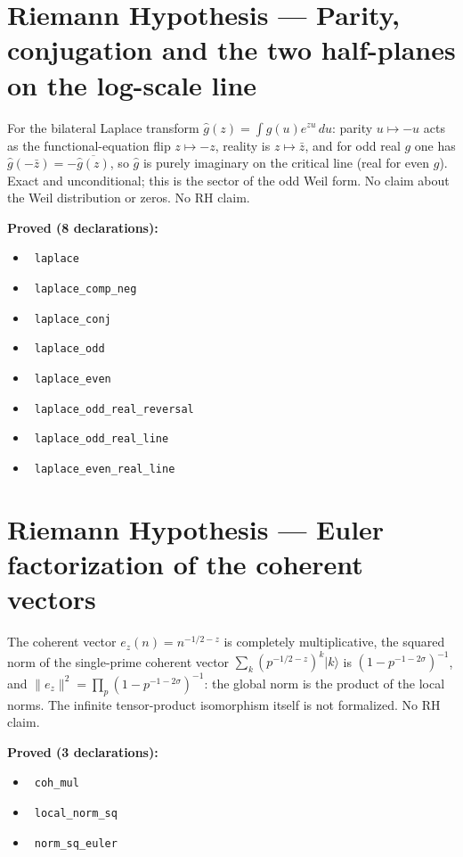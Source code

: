 \documentclass{report}
\theoremstyle{definition}
\begin{document}
\section{Riemann Hypothesis --- Parity, conjugation and the two half-planes on the log-scale line}
For the bilateral Laplace transform $\hat g(z)=\int g(u)e^{zu}\,du$: parity $u\mapsto-u$ acts as the functional-equation flip $z\mapsto-z$, reality is $z\mapsto\bar z$, and for odd real $g$ one has $\hat g(-\bar z)=-\overline{\hat g(z)}$, so $\hat g$ is purely imaginary on the critical line (real for even $g$). Exact and unconditional; this is the sector of the odd Weil form. No claim about the Weil distribution or zeros. No RH claim.

\noindent\textbf{Proved (8 declarations):}
\begin{itemize}
  \item {}\leanok\ \texttt{laplace}
  \item {}\leanok\ \texttt{laplace\_comp\_neg}
  \item {}\leanok\ \texttt{laplace\_conj}
  \item {}\leanok\ \texttt{laplace\_odd}
  \item {}\leanok\ \texttt{laplace\_even}
  \item {}\leanok\ \texttt{laplace\_odd\_real\_reversal}
  \item {}\leanok\ \texttt{laplace\_odd\_real\_line}
  \item {}\leanok\ \texttt{laplace\_even\_real\_line}
\end{itemize}

\section{Riemann Hypothesis --- Euler factorization of the coherent vectors}
The coherent vector $e_z(n)=n^{-1/2-z}$ is completely multiplicative, the squared norm of the single-prime coherent vector $\sum_k(p^{-1/2-z})^k|k\rangle$ is $(1-p^{-1-2\sigma})^{-1}$, and $\|e_z\|^2=\prod_p(1-p^{-1-2\sigma})^{-1}$: the global norm is the product of the local norms. The infinite tensor-product isomorphism itself is not formalized. No RH claim.

\noindent\textbf{Proved (3 declarations):}
\begin{itemize}
  \item {}\leanok\ \texttt{coh\_mul}
  \item {}\leanok\ \texttt{local\_norm\_sq}
  \item {}\leanok\ \texttt{norm\_sq\_euler}
\end{itemize}
\end{document}
